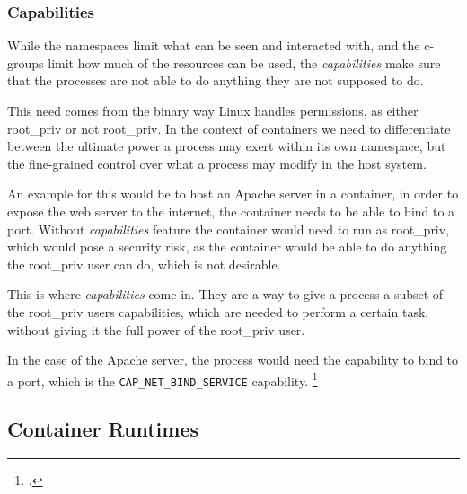 

\subsubsection{Capabilities}

While the namespaces limit what can be seen and interacted with,
and the c-groups limit how much of the resources can be used,
the \textit{capabilities} make sure that the processes are not able to do anything they are not supposed to do.

This need comes from the binary way Linux handles permissions, as either \gls{root_priv} or not \gls{root_priv}.
In the context of containers we need to differentiate between the ultimate power a process may exert within its own namespace,
but the fine-grained control over what a process may modify in the \gls{host} system.

An example for this would be to \gls{host} an Apache server in a container,
in order to expose the web server to the internet, the container needs to be able to bind to a port.
Without \textit{capabilities} feature the container would need to run as \gls{root_priv}, which would pose a security risk,
as the container would be able to do anything the \gls{root_priv} user can do, which is not desirable.

This is where \textit{capabilities} come in.
They are a way to give a process a subset of the \gls{root_priv} users capabilities,
which are needed to perform a certain task, without giving it the full power of the \gls{root_priv} user.

In the case of the Apache server, the process would need the capability to bind to a port, which is the \texttt{CAP\_NET\_BIND\_SERVICE} capability.
\footcite{sultanContainerSecurityIssues2019}





\pagebreak

\subsection{Container Runtimes}


